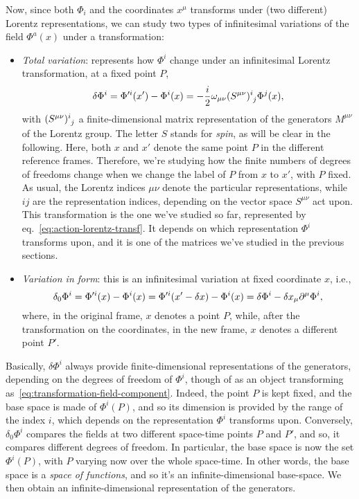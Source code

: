 Now, since both $\Phi_i$ and the coordinates $x^\mu$ transforms under (two different) Lorentz representations, we can study two types of infinitesimal variations of the field $\Phi^a(x)$ under a transformation:
\begin{itemize}
    \item \emph{Total variation}: represents how $\Phi^i$ change under an infinitesimal Lorentz transformation, at a fixed point $P$,
    \begin{equation}\label{eq:lorentz-total-variation}
        \delta \Phi^i = \Phi'^i(x') - \Phi^i(x) = - \frac{i}{2} \omega_{\mu\nu} \tensor{(S^{\mu\nu})}{^i_j} \Phi^j(x) ,
    \end{equation}
    with $\tensor{(S^{\mu\nu})}{^i_j}$ a finite-dimensional matrix representation of the generators $M^{\mu\nu}$ of the Lorentz group. The letter $S$ stands for \emph{spin}, as will be clear in the following. Here, both $x$ and $x'$ denote the same point $P$ in the different reference frames. Therefore, we're studying how the finite numbers of degrees of freedoms change when we change the label of $P$ from $x$ to $x'$, with $P$ fixed. As usual, the Lorentz indices $\mu\nu$ denote the particular representations, while $ij$ are the representation indices, depending on the vector space $S^{\mu\nu}$ act upon. This transformation is the one we've studied so far, represented by eq.~\eqref{eq:action-lorentz-transf}. It depends on which representation $\Phi^i$ transforms upon, and it is one of the matrices we've studied in the previous sections.
    
    \item \emph{Variation in form}: this is an infinitesimal variation at fixed coordinate $x$, i.e.,
    \begin{equation}\label{eq:lorentz-variation-in-form}
        \delta_0 \Phi^i = \Phi'^i(x) - \Phi^i(x) = \Phi'^i (x' - \delta x) - \Phi^i(x) = \delta \Phi^i - \delta x_\mu \partial^\mu \Phi^i ,
    \end{equation}
    where, in the original frame, $x$ denotes a point $P$, while, after the transformation on the coordinates, in the new frame, $x$ denotes a different point $P'$.
\end{itemize}

Basically, $\delta \Phi^i$ always provide finite-dimensional representations of the generators, depending on the degrees of freedom of $\Phi^i$, though of as an object transforming as~\eqref{eq:transformation-field-component}. Indeed, the point $P$ is kept fixed, and the base space is made of $\Phi^i(P)$, and so its dimension is provided by the range of the index $i$, which depends on the representation $\Phi^i$ transforms upon. Conversely, $\delta_0 \Phi^i$ compares the fields at two different space-time points $P$ and $P'$, and so, it compares different degrees of freedom. In particular, the base space is now the set $\Phi^i(P)$, with $P$ varying now over the whole space-time. In other words, the base space is a \emph{space of functions}, and so it's an infinite-dimensional base-space. We then obtain an infinite-dimensional representation of the generators.


